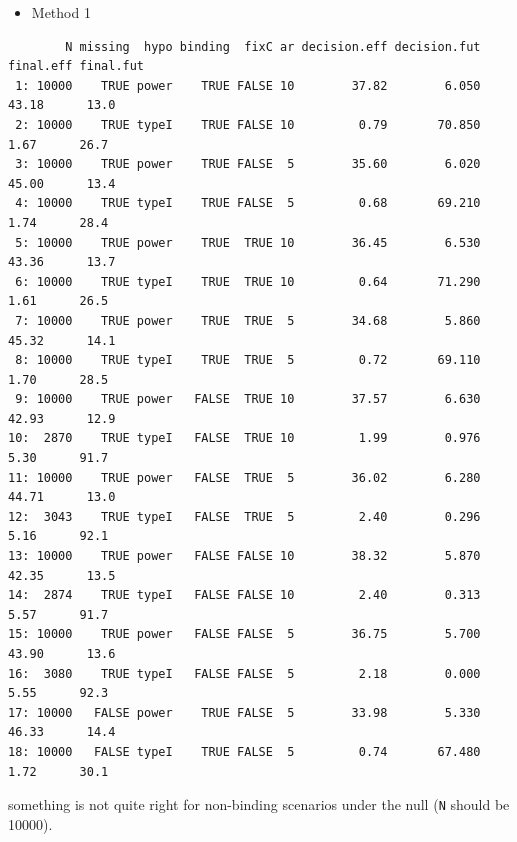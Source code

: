 \documentclass[12pt]{article}
\newcommand\Warning[1][3ex]{%
\renewcommand\stacktype{L}%
\scaleto{\stackon[1.3pt]{\color{red}$\triangle$}{\tiny\bfseries !}}{#1}%
\xspace
}
\begin{document}
\begin{itemize}
\item Method 1
\end{itemize}
\begin{verbatim}
        N missing  hypo binding  fixC ar decision.eff decision.fut final.eff final.fut
 1: 10000    TRUE power    TRUE FALSE 10        37.82        6.050     43.18      13.0
 2: 10000    TRUE typeI    TRUE FALSE 10         0.79       70.850      1.67      26.7
 3: 10000    TRUE power    TRUE FALSE  5        35.60        6.020     45.00      13.4
 4: 10000    TRUE typeI    TRUE FALSE  5         0.68       69.210      1.74      28.4
 5: 10000    TRUE power    TRUE  TRUE 10        36.45        6.530     43.36      13.7
 6: 10000    TRUE typeI    TRUE  TRUE 10         0.64       71.290      1.61      26.5
 7: 10000    TRUE power    TRUE  TRUE  5        34.68        5.860     45.32      14.1
 8: 10000    TRUE typeI    TRUE  TRUE  5         0.72       69.110      1.70      28.5
 9: 10000    TRUE power   FALSE  TRUE 10        37.57        6.630     42.93      12.9
10:  2870    TRUE typeI   FALSE  TRUE 10         1.99        0.976      5.30      91.7
11: 10000    TRUE power   FALSE  TRUE  5        36.02        6.280     44.71      13.0
12:  3043    TRUE typeI   FALSE  TRUE  5         2.40        0.296      5.16      92.1
13: 10000    TRUE power   FALSE FALSE 10        38.32        5.870     42.35      13.5
14:  2874    TRUE typeI   FALSE FALSE 10         2.40        0.313      5.57      91.7
15: 10000    TRUE power   FALSE FALSE  5        36.75        5.700     43.90      13.6
16:  3080    TRUE typeI   FALSE FALSE  5         2.18        0.000      5.55      92.3
17: 10000   FALSE power    TRUE FALSE  5        33.98        5.330     46.33      14.4
18: 10000   FALSE typeI    TRUE FALSE  5         0.74       67.480      1.72      30.1
\end{verbatim}
\Warning something is not quite right for non-binding scenarios under the null (\texttt{N} should be 10000).

\clearpage
\end{document}
